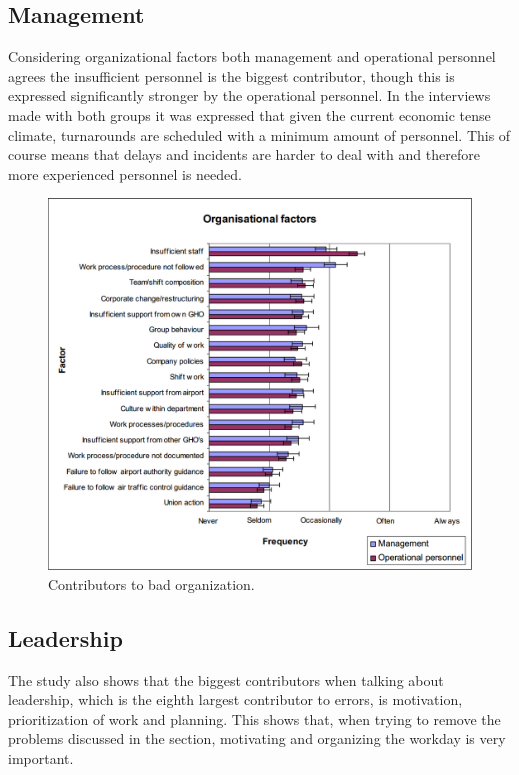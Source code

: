 \newpage
\subsection{Management} %
Considering organizational factors both management and operational personnel agrees the insufficient personnel is the biggest contributor, though this is expressed significantly stronger by the operational personnel. In the interviews made with both groups it was expressed that given the current economic tense climate, turnarounds are scheduled with a minimum amount of personnel. This of course means that delays and incidents are harder to deal with and therefore more experienced personnel is needed.

\begin{figure}[H]
\centering
\includegraphics[width=\textwidth]{Grafik/OrganisationalFactors}
\caption{Contributors to bad organization.}
\label{OrganisationalFactors}
\end{figure}

\subsection{Leadership}
The study also shows that the biggest contributors when talking about leadership, which is the eighth largest contributor to errors, is motivation, prioritization of work and planning. This shows that, when trying to remove the problems discussed in the section, motivating and organizing the workday is very important.

